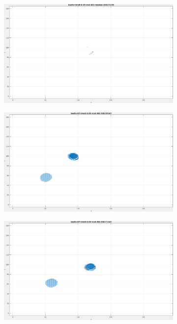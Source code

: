 \begin{figure}[tb]
\begin{subfigure}{.45\textwidth}
  \caption{}
\end{subfigure}
\begin{subfigure}{.45\textwidth}
  \centering
  \includegraphics[height=.6\linewidth]{figs/baelle/baelle-masked-2.png}
  \caption{}
\end{subfigure}
\begin{subfigure}{.45\textwidth}
  \centering
  \includegraphics[height=.6\linewidth]{figs/baelle/baelle-GT-1.png}
  \caption{}
\end{subfigure}
\begin{subfigure}{.45\textwidth}
  \centering
  \includegraphics[height=.6\linewidth]{figs/baelle/baelle-GT-2.png}

\end{subfigure}
\end{figure}

